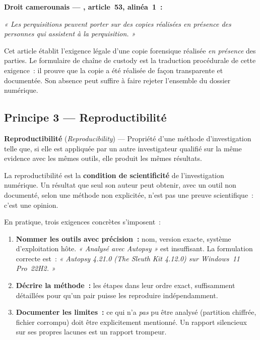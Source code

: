 \begin{boxjuris}
\textbf{Droit camerounais --- , article~53, alinéa~1~:}

\medskip
\textit{« Les perquisitions \textelp{} peuvent porter sur des copies réalisées
en présence des personnes qui assistent à la perquisition. »}

\medskip
Cet article établit l'exigence légale d'une copie forensique réalisée
\emph{en présence} des parties. Le formulaire de chaîne de custody est la
traduction procédurale de cette exigence~: il prouve que la copie a été
réalisée de façon transparente et documentée. Son absence peut suffire à
faire rejeter l'ensemble du dossier numérique.
\end{boxjuris}

\subsection{Principe 3 --- Reproductibilité}
\label{subsec:principe-reproductibilite}

\begin{boxdef}
\textbf{Reproductibilité} (\textit{Reproducibility}) ---
Propriété d'une méthode d'investigation telle que, si elle est appliquée
par un autre investigateur qualifié sur la même evidence avec les mêmes
outils, elle produit les mêmes résultats.
\end{boxdef}

La reproductibilité est la \textbf{condition de scientificité} de
l'investigation numérique. Un résultat que seul son auteur peut obtenir,
avec un outil non documenté, selon une méthode non explicitée, n'est pas
une preuve scientifique~: c'est une opinion.

En pratique, trois exigences concrètes s'imposent~:

\begin{enumerate}
    \item \textbf{Nommer les outils avec précision~:} nom, version exacte,
          système d'exploitation hôte. \textit{« Analysé avec Autopsy »}
          est insuffisant. La formulation correcte est~: \textit{« Autopsy
          4.21.0 (The Sleuth Kit 4.12.0) sur Windows~11 Pro~22H2. »}

    \item \textbf{Décrire la méthode~:} les étapes dans leur ordre exact,
          suffisamment détaillées pour qu'un pair puisse les reproduire
          indépendamment.

    \item \textbf{Documenter les limites~:} ce qui n'a \emph{pas} pu être
          analysé (partition chiffrée, fichier corrompu) doit être
          explicitement mentionné. Un rapport silencieux sur ses propres
          lacunes est un rapport trompeur.
\end{enumerate}

